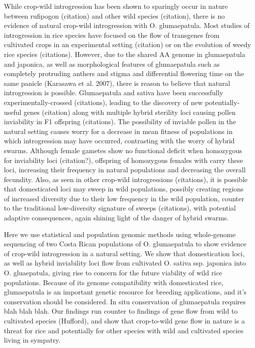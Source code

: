 \documentclass[11pt]{article} %
\begin{document}
While crop-wild introgression has been shown to sparingly occur in nature between rufipogon (citation) and other wild species (citation), there is no evidence of natural crop-wild introgression with O. glumaepatula.  Most studies of introgression in rice species have focused on the flow of transgenes from cultivated crops in an experimental setting (citation) or on the evolution of weedy rice species (citations).  However, due to the shared AA genome in glumaepatula and japonica, as well as morphological features of glumaepatula such as completely protruding anthers and stigma and differential flowering time on the same panicle (Karasawa et al. 2007), there is reason to believe that natural introgression is possible.  Glumaepatula and sativa have been successfully experimentally-crossed (citations), leading to the discovery of new potentially-useful genes (citation) along with multiple hybrid sterility loci causing pollen inviability in F1 offspring (citations).  The possibility of inviable pollen in the natural setting causes worry for a decrease in mean fitness of populations in which introgression may have occurred, contrasting with the worry of hybrid swarms.  Although female gametes show no functional deficit when homozygous for inviability loci (citation?), offspring of homozygous females with carry these loci, increasing their frequency in natural populations and decreasing the overall fecundity.  Also, as seen in other crop-wild introgressions (citations), it is possible that domesticated loci may sweep in wild populations, possibly creating regions of increased diversity due to their low frequency in the wild population, counter to the traditional low-diversity signature of sweeps (citations), with potential adaptive consequences, again shining light of the danger of hybrid swarms.

Here we use statistical and population genomic methods using whole-genome sequencing of two Costa Rican populations of O. glumaepatula to show evidence of crop-wild introgression in a natural setting.  We show that domestication loci, as well as hybrid inviability loci flow from cultivated O. sativa ssp. japonica into O. gluaepatula, giving rise to concern for the future viability of wild rice populations.  Because of its genome compatibility with domesticated rice, glumaepatula is an important genetic resource for breeding applications, and it’s conservation should be considered.  In situ conservation of glumaepatula requires blah blah blah.  Our findings run counter to findings of gene flow from wild to cultivated species (Hufford), and show that crop-to-wild gene flow in nature is a threat for rice and potentially for other species with wild and cultivated species living in sympatry.
\end{document}
